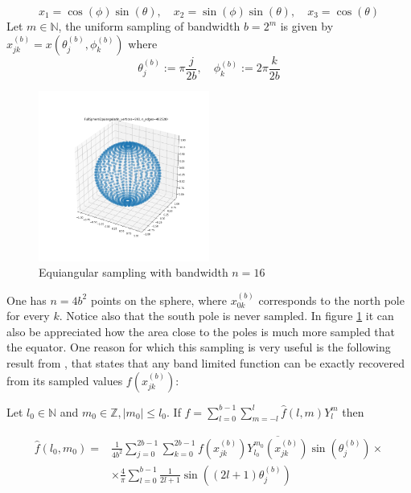 $$
x_{1}=\cos (\phi) \sin (\theta), \quad x_{2}=\sin (\phi) \sin (\theta), \quad x_{3}=\cos (\theta)
$$
Let $m\in\mathbb N$, the uniform sampling of bandwidth $b=2^m$ is given by 
$
x_{j k}^{(b)}=x\left(\theta_{j}^{(b)}, \phi_{k}^{(b)}\right)
$
where
$$
\theta_{j}^{(b)} :=\pi \frac{j}{2 b}, \quad \phi_{k}^{(b)} :=2 \pi \frac{k}{2 b}
$$
\begin{figure}[h!]
	\centering
	\label{fig:equiangular sampling}
	\caption{Equiangular sampling with bandwidth $n=16$}
	\includegraphics[width=0.5\textwidth]{../codes/02.HeatKernelGraphLaplacian/equiangular/equiangular.png}
\end{figure}
One has $n=4b^2$ points on the sphere, where $x_{0 k}^{(b)}$ corresponds to the north pole for every $k$. Notice also that the south pole is never sampled. In figure \ref{fig:equiangular sampling} it can also be appreciated how the area close to the poles is much more sampled that the equator. One reason for which this sampling is very useful is the following result from \cite{Driscoll:1994:CFT:184069.184073}, that states that any band limited function can be exactly recovered from its sampled values $f\left(x_{j k}^{(b)}\right)$:
\vspace{0.5cm}
\begin{prop}\label{prop:equiangular sampling theorem}
	Let \(l_{0} \in \mathbb{N}\) and \(m_{0} \in \mathbb{Z},\left|m_{0}\right| \leq l_{0} .\) If \(f=\sum_{l=0}^{b-1} \sum_{m=-l}^{l} \widehat{f}(l, m) Y_{l}^{m}\)
	then
	
	$$
	\begin{aligned} \widehat{f}\left(l_{0}, m_{0}\right)=& \frac{1}{4 b^{2}} \sum_{j=0}^{2 b-1} \sum_{k=0}^{2 b-1} f\left(x_{j k}^{(b)}\right) \overline{Y_{l_{0}}^{m_{0}}\left(x_{j k}^{(b)}\right)} \sin \left(\theta_{j}^{(b)}\right) \times \\ & \times \frac{4}{\pi} \sum_{l=0}^{b-1} \frac{1}{2 l+1} \sin \left((2 l+1) \theta_{j}^{(b)}\right) \end{aligned}
	$$
\end{prop}
\vspace{0.5cm}


